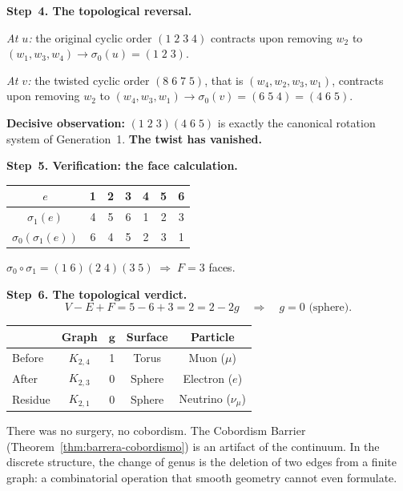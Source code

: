 \bigskip
\noindent
\textbf{Step~4. The topological reversal.}

\textit{At $u$:} the original cyclic order $(1\;2\;3\;4)$ contracts upon
removing $w_2$ to $(w_1, w_3, w_4) \longrightarrow \sigma_0(u) = (1\;2\;3)$.

\textit{At $v$:} the twisted cyclic order $(8\;6\;7\;5)$, that is
$(w_4, w_2, w_3, w_1)$, contracts upon removing $w_2$ to
$(w_4, w_3, w_1) \longrightarrow \sigma_0(v) = (6\;5\;4)=(4\;6\;5)$.

\textbf{Decisive observation:} $(1\;2\;3)(4\;6\;5)$ is exactly the
canonical rotation system of Generation~1. \textbf{The twist has
vanished.}

\bigskip
\noindent
\textbf{Step~5. Verification: the face calculation.}

\begin{center}
\renewcommand{\arraystretch}{1.15}
\begin{tabular}{c@{\;\;}c@{\;\;}c@{\;\;}c@{\;\;}c@{\;\;}c@{\;\;}c}
\toprule
$e$ & 1 & 2 & 3 & 4 & 5 & 6 \\
\midrule
$\sigma_1(e)$ & 4 & 5 & 6 & 1 & 2 & 3 \\
$\sigma_0(\sigma_1(e))$ & 6 & 4 & 5 & 2 & 3 & 1 \\
\bottomrule
\end{tabular}
\end{center}
$\sigma_0 \circ \sigma_1 = (1\;6)(2\;4)(3\;5) \;\Longrightarrow\; F = 3$
faces.

\bigskip
\noindent
\textbf{Step~6. The topological verdict.}
\[
  V - E + F = 5 - 6 + 3 = 2 = 2 - 2g
  \quad\Longrightarrow\quad \boxed{g = 0}\text{ (sphere).}
  \tag{$\mu$-II}
\]

\begin{result}[title={Balance of the decay}]
\begin{center}
\renewcommand{\arraystretch}{1.2}
\begin{tabular}{lcccc}
\toprule
& \textbf{Graph} & $\boldsymbol{g}$ & \textbf{Surface}
  & \textbf{Particle} \\
\midrule
Before   & $K_{2,4}$ & 1 & Torus   & Muon ($\mu$) \\
After    & $K_{2,3}$ & 0 & Sphere  & Electron ($e$) \\
Residue  & $K_{2,1}$ & 0 & Sphere  & Neutrino ($\nu_\mu$) \\
\bottomrule
\end{tabular}
\end{center}
There was no surgery, no cobordism. The Cobordism Barrier
(Theorem~\ref{thm:barrera-cobordismo}) is an artifact of the continuum.
In the discrete structure, the change of genus is the deletion of two
edges from a finite graph: a combinatorial operation that smooth geometry
cannot even formulate.
\end{result}

